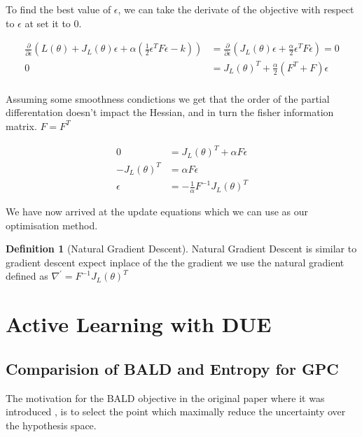 \documentclass[12pt, a4paper]{report}
\theoremstyle{definition}
\newtheorem{definition}{Definition}[section]
\begin{document}
To find the best value of $\epsilon$, we can take the derivate of the objective with respect to $\epsilon$ at set it to $0$.


\begin{align}
   \frac{\partial}{\partial \epsilon} \left( L\left( \theta \right) + J_L \left( \theta\right) \epsilon + \alpha \left( \frac{1}{2} \epsilon^T F \epsilon - k\right) \right) &=  \frac{\partial}{\partial \epsilon} \left( J_L \left( \theta\right) \epsilon + \frac{\alpha}{2} \epsilon^T F \epsilon  \right) = 0\\
  0 &=  J_L \left( \theta\right)^T + \frac{\alpha}{2}  \left(F^T + F \right)\epsilon\\
\end{align}

Assuming some smoothness condictions we get that the order of the partial differentation doesn't impact the Hessian, and in turn the fisher information matrix. $F = F^T$

\begin{align}
   0 &=  J_L \left( \theta\right)^T + \alpha F \epsilon\\
   - J_L \left( \theta\right)^T &=  \alpha F \epsilon\\
  \epsilon &=  - \frac{1}{\alpha} F^{-1} J_L \left( \theta\right) ^T
\end{align} 

We have now arrived at the update equations which we can use as our optimisation method.


\begin{definition}[Natural Gradient Descent]
    Natural Gradient Descent is similar to gradient descent expect inplace of the the gradient we use the natural gradient defined as $\nabla^{\prime} =  F^{-1} J_L \left( \theta \right)^T$
\end{definition}






\chapter{Active Learning with DUE}
\label{Chap5}



\section{Comparision of BALD and Entropy for GPC}

The motivation for the BALD objective in the original paper where it was introduced \cite{houlsby2011bayesian}, is to select the point which maximally reduce the uncertainty over the hypothesis space.
\end{document}
